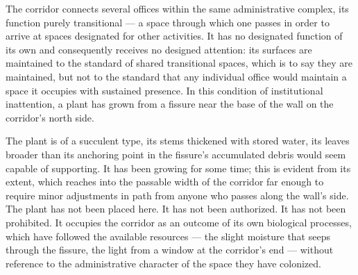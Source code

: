 \documentclass[12pt, oneside]{article}
\newenvironment{action}{%
  \vspace{0.6em}%
  \noindent\ignorespaces%
}{%
  \par\vspace{0.6em}%
}
\begin{document}
\begin{action}
The corridor connects several offices within the same administrative complex, its function purely transitional --- a space through which one passes in order to arrive at spaces designated for other activities. It has no designated function of its own and consequently receives no designed attention: its surfaces are maintained to the standard of shared transitional spaces, which is to say they are maintained, but not to the standard that any individual office would maintain a space it occupies with sustained presence. In this condition of institutional inattention, a plant has grown from a fissure near the base of the wall on the corridor's north side.

The plant is of a succulent type, its stems thickened with stored water, its leaves broader than its anchoring point in the fissure's accumulated debris would seem capable of supporting. It has been growing for some time; this is evident from its extent, which reaches into the passable width of the corridor far enough to require minor adjustments in path from anyone who passes along the wall's side. The plant has not been placed here. It has not been authorized. It has not been prohibited. It occupies the corridor as an outcome of its own biological processes, which have followed the available resources --- the slight moisture that seeps through the fissure, the light from a window at the corridor's end --- without reference to the administrative character of the space they have colonized.
\end{action}
\end{document}
